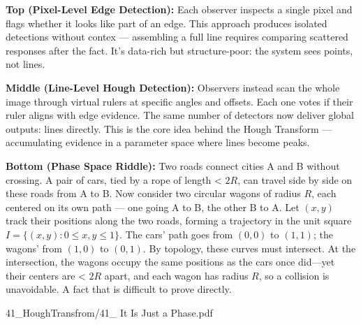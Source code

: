 \begin{SideNotePage}{
  \textbf{Top (Pixel-Level Edge Detection):}  
  Each observer inspects a single pixel and flags whether it looks like part of an edge. This approach produces isolated detections without contex — assembling a full line requires comparing scattered responses after the fact. It's data-rich but structure-poor: the system sees points, not lines. \par

  \textbf{Middle (Line-Level Hough Detection):}  
  Observers instead scan the whole image through virtual rulers at specific angles and offsets. Each one votes if their ruler aligns with edge evidence. The same number of detectors now deliver global outputs: lines directly. This is the core idea behind the Hough Transform — accumulating evidence in a parameter space where lines become peaks. \par

  \textbf{Bottom (Phase Space Riddle):}  
  Two roads connect cities A and B without crossing. A pair of cars, tied by a rope of length < $2R$, can travel side by side on these roads from A to B. Now consider two circular wagons of radius $R$, each centered on its own path — one going A to B, the other B to A. Let $(x, y)$ track their positions along the two roads, forming a trajectory in the unit square $I = \{(x, y) : 0 \leq x, y \leq 1\}$. The cars’ path goes from $(0, 0)$ to $(1, 1)$; the wagons' from $(1, 0)$ to $(0, 1)$. By topology, these curves must intersect. At the intersection, the wagons occupy the same positions as the cars once did—yet their centers are < $2R$ apart, and each wagon has radius $R$, so a collision is unavoidable. A fact that is difficult to prove directly. \par    
}{41_HoughTransfrom/41_ It Is Just a Phase.pdf}
\end{SideNotePage}
